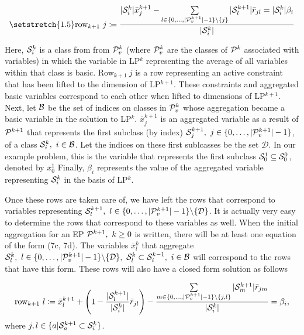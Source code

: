 \documentclass[11pt]{article} %
\newcommand{\cP}{{\cal P}}
\newcommand{\cB}{{\cal B}}
\newcommand{\cS}{{\cal S}}
\begin{document}
	\begin{equation}\setstretch{1.5}
	\text{row}_{k + 1} \ j \coloneqq \frac{|\cS_i^{k}|\bar{x}_j^{k + 1} - \sum\limits_{l \in \{0, \dots, |\cP^{k + 1}_v| - 1\} \backslash \{j\}}|\cS^{k + 1}_l|\bar{r}_{jl} = |\cS^{k}_i|\beta_i}{|\cS_i^{k}|}
	\end{equation}
	
	Here, $\cS_i^{k}$ is a class from from $\cP^k_v$ (where $\cP^k_v$ are the classes of $\cP^k$ associated with variables)  in which the variable in LP$^k$ representing the average of all variables within that class is basic.  Row$_{k + 1} \ j$ is a row representing an active constraint that has been lifted to the dimension of LP$^{k + 1}$.  These constraints and aggregated basic variables correspond to each other when lifted to dimensions of LP$^{k + 1}$.  Next, let $\cB$ be the set of indices on classes in $\cP^k_v$ whose aggregation became a basic variable in the solution to LP$^k$.  $\bar{x}_j^{k + 1}$ is an aggregated variable as a result of $\cP^{k + 1}$ that represents the first subclass (by index) $\cS_j^{k + 1}, \ j  \in \{0, \dots, |\cP^{k + 1}_v| - 1\}$, of a class $\cS_i^k , \ i \in \cB$.  Let the indices on these first sublcasses be the set $\mathcal{D}$.  In our example problem, this is the variable that represents the first subclass $\cS_0^1 \subseteq \cS_0^0$, denoted by $\bar{x}_0^1$  Finally, $\beta_i$ represents the value of the aggregated variable representing $\cS_i^k$ in the basis of LP$^k$.
	
	Once these rows are taken care of, we have left the rows that correspond to variables representing $\cS_l^{k + 1},\ l \in  \{0, \dots, |\cP^{k + 1}_v| - 1\} \backslash \{\mathcal{D}\}$.  It is actually very easy to determine the rows that correspond to these variables as well.  When the initial aggregation for an EP $\cP^{k + 1}, \ k \geq 0$ is written, there will be at least one equation of the form (7c, 7d).  The variables $\bar{x}_l^k$ that aggregate $ \cS_l^k, \  l \in  \{0, \dots, |\cP^{k + 1}_v| - 1\} \backslash \{\mathcal{D}\}, \ \cS_l^k \subset \cS_i^{k - 1}, \ i \in \cB$ will correspond to the rows that have this form.  These rows will also have a closed form solution as follows
	
	\begin{equation}
	 \text{row}_{k + 1} \ l \coloneqq \bar{x}_l^{k + 1} + \left(1 - \frac{|\cS^{k + 1}_l|}{|\cS_i^{k}|}\bar{r}_{jl}\right) - \frac{\sum\limits_{m \in \{0, \dots, |\cP^{k + 1}_v| - 1\} \backslash \{j, l\}}|\cS^{k + 1}_m|\bar{r}_{jm}}{|\cS_i^{k}|} = \beta_i, 
	\end{equation}
	where $j,l \in \{a|\cS_a^{k + 1} \subset \cS_i^{k} \}$.
	
\end{document}
